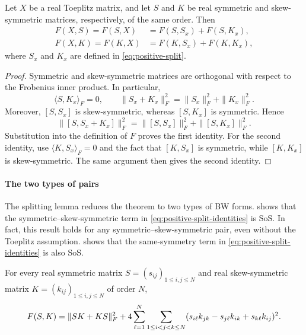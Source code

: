 \begin{lemma}
\label{lem:positive-split}
Let $X$ be a real Toeplitz matrix, and let $S$ and $K$ be real
symmetric and skew-symmetric matrices, respectively, of the same order.
Then
\begin{equation}\label{eq:positive-split-identities}
 \begin{aligned}
 F(X,S)=F(S,X)&=F(S,S_x)+F(S,K_x),\\
 F(X,K)=F(K,X)&=F(K,S_x)+F(K,K_x),
 \end{aligned}
\end{equation}
where $S_x$ and $K_x$ are defined in \eqref{eq:positive-split}.
\end{lemma}

\begin{proof}
Symmetric and skew-symmetric matrices are orthogonal with respect to
the Frobenius inner product.  In particular,
\[
 \langle S,K_x\rangle_F=0,
 \qquad
 \|S_x+K_x\|_F^2
 =
 \|S_x\|_F^2+\|K_x\|_F^2.
\]
Moreover, $[S,S_x]$ is skew-symmetric, whereas $[S,K_x]$ is symmetric.
Hence
\[
 \|[S,S_x+K_x]\|_F^2
 =
 \|[S,S_x]\|_F^2+\|[S,K_x]\|_F^2.
\]
Substitution into the definition of $F$ proves the first identity.
For the second identity, use
$
\langle K,S_x\rangle_F=0
$
and the fact that $[K,S_x]$ is symmetric, while $[K,K_x]$ is
skew-symmetric.  The same argument then gives the second identity.
\end{proof}

\paragraph{The two types of pairs}
\label{subsec:positive-pairs}

The splitting lemma  reduces the theorem to two
types of BW forms.   shows that the
symmetric--skew-symmetric term in \eqref{eq:positive-split-identities}
is SoS.  In fact, this result holds for any symmetric--skew-symmetric
pair, even without the Toeplitz assumption.  
shows that the same-symmetry term in
\eqref{eq:positive-split-identities} is also SoS.

\begin{lemma}
\label{lem:positive-mixed}
For every real symmetric matrix
$S=(s_{ij})_{1\le i,j\le N}$ and real skew-symmetric matrix
$K=(k_{ij})_{1\le i,j\le N}$ of order $N$,
\begin{equation}\label{eq:positive-mixed}
 F(S,K)
 =
 \lVert SK+KS\rVert_F^2
 +
 4\sum_{\ell=1}^N
 \sum_{1\le i<j<k\le N}
 (s_{i\ell}k_{jk}-s_{j\ell}k_{ik}+s_{k\ell}k_{ij})^2.
\end{equation}
\end{lemma}

